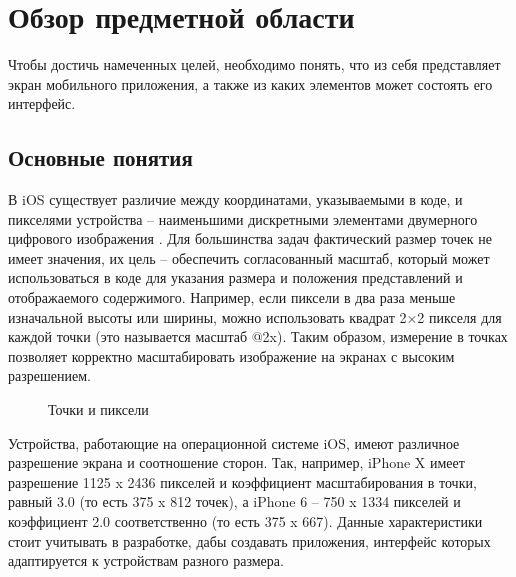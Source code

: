 \chapter{Обзор предметной области}

Чтобы достичь намеченных целей, необходимо понять, что из себя представляет экран мобильного приложения, а также из каких элементов может состоять его интерфейс.

\section{Основные понятия}
В iOS существует различие между координатами, указываемыми в коде, и пикселями устройства -- наименьшими дискретными элементами двумерного цифрового изображения \cite{pixel}. Для большинства задач фактический размер точек \cite{point} не имеет значения, их цель -- обеспечить согласованный масштаб, который может использоваться в коде для указания размера и положения представлений и отображаемого содержимого. Например, если пиксели в два раза меньше изначальной высоты или ширины, можно использовать квадрат 2×2 пикселя для каждой точки (это называется масштаб @2x). Таким образом, измерение в точках позволяет корректно масштабировать изображение на экранах с высоким разрешением. \cite{hig}

\begin{figure}[h!]
	\caption{Точки и пиксели}
	\label{fig:points}
\end{figure}

Устройства, работающие на операционной системе iOS, имеют различное разрешение экрана и соотношение сторон. Так, например, iPhone X имеет разрешение 1125 x 2436 пикселей и коэффициент масштабирования в точки, равный 3.0 (то есть 375 x 812 точек), а iPhone 6  -- 750 x 1334 пикселей и коэффициент 2.0 соответственно (то есть 375 x 667). Данные характеристики стоит учитывать в разработке, дабы создавать приложения, интерфейс которых адаптируется к устройствам разного размера. 


